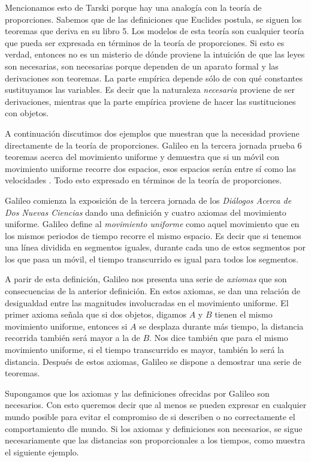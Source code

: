 Mencionamos esto de Tarski porque hay una analogía con la teoría de proporciones. Sabemos que de las definiciones que Euclides postula, se siguen los teoremas que deriva en su libro 5. Los modelos de esta teoría son cualquier teoría que pueda ser expresada en términos de la teoría de proporciones. Si esto es verdad, entonces no es un misterio de dónde proviene la intuición de que las leyes son necesarias, son necesarias porque dependen de un aparato formal y las derivaciones son teoremas. La parte empírica depende sólo de con qué constantes sustituyamos las variables. Es decir que la naturaleza \emph{necesaria} proviene de ser derivaciones, mientras que la parte empírica proviene de hacer las sustituciones con objetos.

A continuación discutimos dos ejemplos que muestran que la necesidad proviene directamente de la teoría de proporciones. Galileo en la tercera jornada prueba 6 teoremas acerca del movimiento uniforme y demuestra que si un móvil con movimiento uniforme recorre dos espacios, esos espacios serán entre sí como las velocidades \cite[p. 215]{galtre}. Todo esto expresado en términos de la teoría de proporciones.

Galileo comienza la exposición de la tercera jornada de los \emph{Diálogos Acerca de Dos Nuevas Ciencias} dando una definición y cuatro axiomas del movimiento uniforme. Galileo define al \textit{movimiento uniforme} como aquel movimiento que en los mismos periodos de tiempo recorre el mismo espacio. Es decir que si tenemos una línea dividida en segmentos iguales, durante cada uno de estos segmentos por los que pasa un móvil, el tiempo transcurrido es igual para todos los segmentos.

A parir de esta definición, Galileo nos presenta una serie de \textit{axiomas} que son consecuencias de la anterior definición. En estos axiomas, se dan una relación de desigualdad entre las magnitudes involucradas en el movimiento uniforme. El primer axioma señala que si dos objetos, digamos $A$ y $B$ tienen el mismo movimiento uniforme, entonces si $A$ se desplaza durante más tiempo, la distancia recorrida también será mayor a la de $B$. Nos dice también que para el mismo movimiento uniforme, si el tiempo transcurrido es mayor, también lo será la distancia. Después de estos axiomas, Galileo se dispone a demostrar una serie de teoremas.

Supongamos que los axiomas y las definiciones ofrecidas por Galileo son necesarios. Con esto queremos decir que al menos se pueden expresar en cualquier mundo posible para evitar el compromiso de si describen o no correctamente el comportamiento dle mundo. Si los axiomas y definiciones son necesarios, se sigue necesariamente que las distancias son proporcionales a los tiempos, como muestra el siguiente ejemplo.

